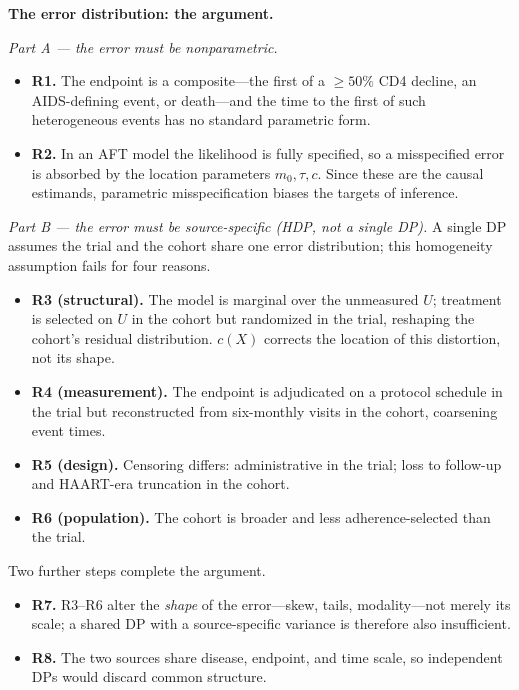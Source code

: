 \documentclass[11pt]{article}
\theoremstyle{plain}
\theoremstyle{definition}
\theoremstyle{remark}
\newcommand{\1}{\mathds{1}}
\begin{document}
\textbf{The error distribution: the argument.}

\medskip
\noindent\emph{Part A --- the error must be nonparametric.}
\begin{itemize}
  \item \textbf{R1.} The endpoint is a composite---the first of a $\geq 50\%$
        CD4 decline, an AIDS-defining event, or death---and the time to the
        first of such heterogeneous events has no standard parametric form.
  \item \textbf{R2.} In an AFT model the likelihood is fully specified, so a
        misspecified error is absorbed by the location parameters
        $m_0,\tau,c$. Since these are the causal estimands, parametric
        misspecification biases the targets of inference.
\end{itemize}

\noindent\emph{Part B --- the error must be source-specific (HDP, not a single DP).}
A single DP assumes the trial and the cohort share one error distribution; this
homogeneity assumption fails for four reasons.
\begin{itemize}
  \item \textbf{R3 (structural).} The model is marginal over the unmeasured $U$;
        treatment is selected on $U$ in the cohort but randomized in the trial,
        reshaping the cohort's residual distribution. $c(X)$ corrects the
        location of this distortion, not its shape.
  \item \textbf{R4 (measurement).} The endpoint is adjudicated on a protocol
        schedule in the trial but reconstructed from six-monthly visits in the
        cohort, coarsening event times.
  \item \textbf{R5 (design).} Censoring differs: administrative in the trial;
        loss to follow-up and HAART-era truncation in the cohort.
  \item \textbf{R6 (population).} The cohort is broader and less
        adherence-selected than the trial.
\end{itemize}
Two further steps complete the argument.
\begin{itemize}
  \item \textbf{R7.} R3--R6 alter the \emph{shape} of the error---skew, tails,
        modality---not merely its scale; a shared DP with a source-specific
        variance is therefore also insufficient.
  \item \textbf{R8.} The two sources share disease, endpoint, and time scale, so
        independent DPs would discard common structure.
\end{itemize}
\end{document}
